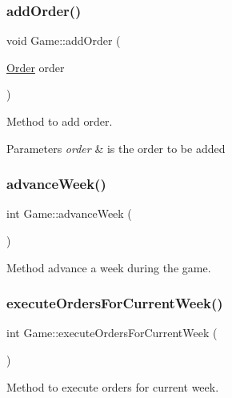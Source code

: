 \subsubsection{\texorpdfstring{add\+Order()}{addOrder()}}
{\footnotesize\ttfamily void Game\+::add\+Order (\begin{DoxyParamCaption}\item[{\hyperlink{class_order}{Order}}]{order }\end{DoxyParamCaption})}



Method to add order. 


\begin{DoxyParams}{Parameters}
{\em order} & is the order to be added \\
\hline
\end{DoxyParams}
\mbox{\label{class_game_a8471ea91ed18fc2d289eb23747d11d39}} 
\subsubsection{\texorpdfstring{advance\+Week()}{advanceWeek()}}
{\footnotesize\ttfamily int Game\+::advance\+Week (\begin{DoxyParamCaption}{ }\end{DoxyParamCaption})}



Method advance a week during the game. 

\mbox{\label{class_game_aa48501c52deee3c167334844e72a16b9}} 
\subsubsection{\texorpdfstring{execute\+Orders\+For\+Current\+Week()}{executeOrdersForCurrentWeek()}}
{\footnotesize\ttfamily int Game\+::execute\+Orders\+For\+Current\+Week (\begin{DoxyParamCaption}{ }\end{DoxyParamCaption})}



Method to execute orders for current week. 

\mbox{\label{class_game_aa083541e01feec6694497e8c6eb5ffe8}} 
